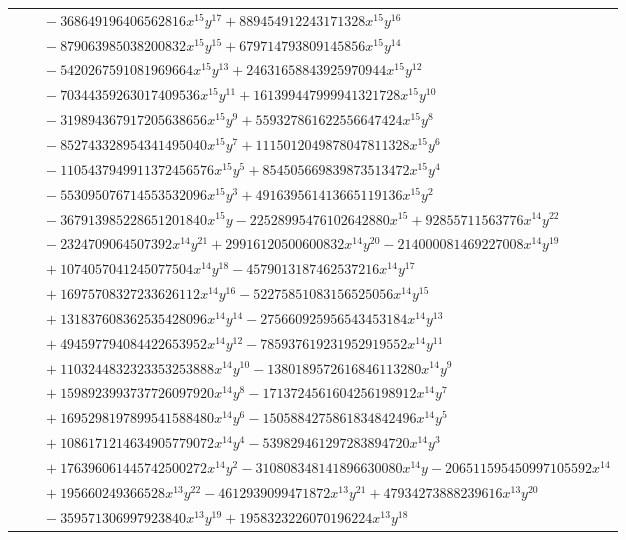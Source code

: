 \documentclass[11pt]{article}
\begin{document}
\begin{longtable}{@{}ll@{}}
 & $\quad -368649196406562816x^{15}y^{17}+889454912243171328x^{15}y^{16}$\\
 & $\quad -879063985038200832x^{15}y^{15}+679714793809145856x^{15}y^{14}$\\
 & $\quad -5420267591081969664x^{15}y^{13}+24631658843925970944x^{15}y^{12}$\\
 & $\quad -70344359263017409536x^{15}y^{11}+161399447999941321728x^{15}y^{10}$\\
 & $\quad -319894367917205638656x^{15}y^{9}+559327861622556647424x^{15}y^{8}$\\
 & $\quad -852743328954341495040x^{15}y^{7}+1115012049878047811328x^{15}y^{6}$\\
 & $\quad -1105437949911372456576x^{15}y^{5}+854505669839873513472x^{15}y^{4}$\\
 & $\quad -553095076714553532096x^{15}y^{3}+491639561413665119136x^{15}y^{2}$\\
 & $\quad -367913985228651201840x^{15}y-22528995476102642880x^{15}+92855711563776x^{14}y^{22}$\\
 & $\quad -2324709064507392x^{14}y^{21}+29916120500600832x^{14}y^{20}-214000081469227008x^{14}y^{19}$\\
 & $\quad +1074057041245077504x^{14}y^{18}-4579013187462537216x^{14}y^{17}$\\
 & $\quad +16975708327233626112x^{14}y^{16}-52275851083156525056x^{14}y^{15}$\\
 & $\quad +131837608362535428096x^{14}y^{14}-275660925956543453184x^{14}y^{13}$\\
 & $\quad +494597794084422653952x^{14}y^{12}-785937619231952919552x^{14}y^{11}$\\
 & $\quad +1103244832323353253888x^{14}y^{10}-1380189572616846113280x^{14}y^{9}$\\
 & $\quad +1598923993737726097920x^{14}y^{8}-1713724561604256198912x^{14}y^{7}$\\
 & $\quad +1695298197899541588480x^{14}y^{6}-1505884275861834842496x^{14}y^{5}$\\
 & $\quad +1086171214634905779072x^{14}y^{4}-539829461297283894720x^{14}y^{3}$\\
 & $\quad +176396061445742500272x^{14}y^{2}-310808348141896630080x^{14}y-206511595450997105592x^{14}$\\
 & $\quad +195660249366528x^{13}y^{22}-4612939099471872x^{13}y^{21}+47934273888239616x^{13}y^{20}$\\
 & $\quad -359571306997923840x^{13}y^{19}+1958323226070196224x^{13}y^{18}$\\

\end{longtable}
\end{document}
